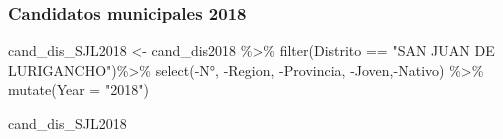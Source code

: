 \documentclass[
]{book}
\newenvironment{Shaded}{\begin{snugshade}}{\end{snugshade}}
\newcommand{\AttributeTok}[1]{\textcolor[rgb]{0.77,0.63,0.00}{#1}}
\newcommand{\FunctionTok}[1]{\textcolor[rgb]{0.00,0.00,0.00}{#1}}
\newcommand{\NormalTok}[1]{#1}
\newcommand{\OtherTok}[1]{\textcolor[rgb]{0.56,0.35,0.01}{#1}}
\newcommand{\SpecialCharTok}[1]{\textcolor[rgb]{0.00,0.00,0.00}{#1}}
\newcommand{\StringTok}[1]{\textcolor[rgb]{0.31,0.60,0.02}{#1}}
\begin{document}
\hypertarget{candidatos-municipales-2018}{%
\subsubsection{Candidatos municipales 2018}\label{candidatos-municipales-2018}}

\begin{Shaded}
\begin{Highlighting}[]
\NormalTok{cand\_dis\_SJL2018 }\OtherTok{\textless{}{-}}\NormalTok{ cand\_dis2018 }\SpecialCharTok{\%\textgreater{}\%}
  \FunctionTok{filter}\NormalTok{(Distrito }\SpecialCharTok{==} \StringTok{"SAN JUAN DE LURIGANCHO"}\NormalTok{)}\SpecialCharTok{\%\textgreater{}\%}
  \FunctionTok{select}\NormalTok{(}\SpecialCharTok{{-}}\StringTok{\textasciigrave{}}\AttributeTok{N°}\StringTok{\textasciigrave{}}\NormalTok{, }\SpecialCharTok{{-}}\StringTok{\textasciigrave{}}\AttributeTok{Region}\StringTok{\textasciigrave{}}\NormalTok{, }\SpecialCharTok{{-}}\StringTok{\textasciigrave{}}\AttributeTok{Provincia}\StringTok{\textasciigrave{}}\NormalTok{, }\SpecialCharTok{{-}}\StringTok{\textasciigrave{}}\AttributeTok{Joven}\StringTok{\textasciigrave{}}\NormalTok{,}\SpecialCharTok{{-}}\StringTok{\textasciigrave{}}\AttributeTok{Nativo}\StringTok{\textasciigrave{}}\NormalTok{) }\SpecialCharTok{\%\textgreater{}\%} 
  \FunctionTok{mutate}\NormalTok{(}\AttributeTok{Year =} \StringTok{"2018"}\NormalTok{)}
\end{Highlighting}
\end{Shaded}

\begin{Shaded}
\begin{Highlighting}[]
\NormalTok{cand\_dis\_SJL2018}
\end{Highlighting}
\end{Shaded}
\end{document}
